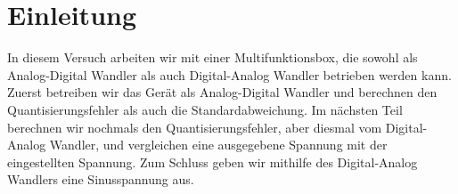 \documentclass[TGAI_Laborbericht.tex]{subfiles}
\begin{document}
\chapter{Einleitung}
\label{chap:EINL}
\pagestyle{plain}

In diesem Versuch arbeiten wir mit einer Multifunktionsbox, die sowohl als Analog-Digital Wandler als auch Digital-Analog Wandler betrieben werden kann. Zuerst betreiben wir das Gerät als Analog-Digital Wandler und berechnen den Quantisierungsfehler als auch die Standardabweichung. Im nächsten Teil berechnen wir nochmals den Quantisierungsfehler, aber diesmal vom Digital-Analog Wandler, und vergleichen eine ausgegebene Spannung mit der eingestellten Spannung. Zum Schluss geben wir mithilfe des Digital-Analog Wandlers eine Sinusspannung aus. 
\end{document}

